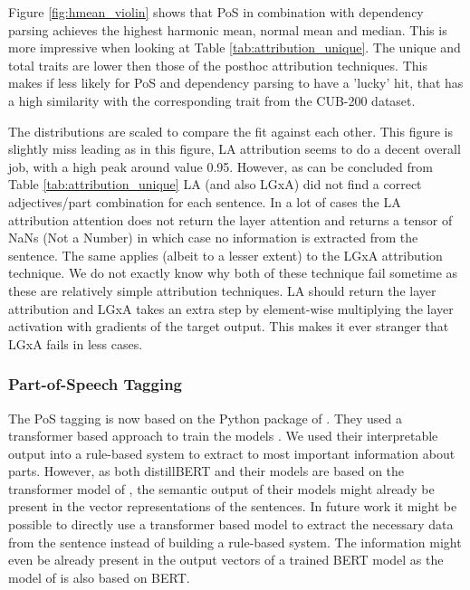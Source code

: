 \documentclass[a4paper, 12pt, oneside]{book} %
\begin{document}
Figure \ref{fig:hmean_violin} shows that PoS in combination with dependency parsing achieves the highest harmonic mean, normal mean and median.
This is more impressive when looking at Table \ref{tab:attribution_unique}.
The unique and total traits are lower then those of the posthoc attribution techniques. 
This makes if less likely for PoS and dependency parsing to have a 'lucky' hit, that has a high similarity with the corresponding trait from the CUB-200 dataset.

The distributions are scaled to compare the fit against each other. 
This figure is slightly miss leading as in this figure, LA attribution seems to do a decent overall job, with a high peak around value 0.95.
However, as can be concluded from Table \ref{tab:attribution_unique} LA (and also LGxA) did not find a correct adjectives/part combination for each sentence.
In a lot of cases the LA attribution attention does not return the layer attention and returns a tensor of NaNs (Not a Number) in which case no information is extracted from the sentence.
The same applies (albeit to a lesser extent) to the LGxA attribution technique.
We do not exactly know why both of these technique fail sometime as these are relatively simple attribution techniques.
LA should return the layer attribution and LGxA takes an extra step by element-wise multiplying the layer activation with gradients of the target output.
This makes it ever stranger that LGxA fails in less cases.



\subsubsection{Part-of-Speech Tagging}
The PoS tagging is now based on the Python package of \textcite{honnibal_spacy_2020}.
They used a transformer based approach to train the models \autocite{wolf_huggingfaces_2020, vaswani_attention_2017}.
We used their interpretable output into a rule-based system to extract to most important information about parts.
However, as both distillBERT and their models are based on the transformer model of \textcite{vaswani_attention_2017}, the semantic output of their models might already be present in the vector representations of the sentences.
In future work it might be possible to directly use a transformer based model to extract the necessary data from the sentence instead of building a rule-based system.
The information might even be already present in the output vectors of a trained BERT model as the model of \textcite{wolf_huggingfaces_2020} is also based on BERT.
\end{document}
